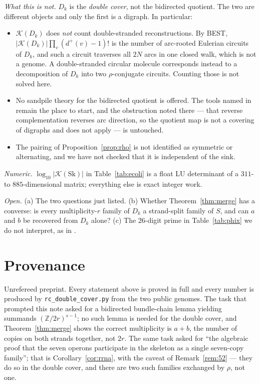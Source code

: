 \documentclass[11pt]{article}
\theoremstyle{plain}
\theoremstyle{definition}
\theoremstyle{remark}
\newcommand{\Z}{\mathbb{Z}}
\newcommand{\K}{\mathcal{K}}
\newcommand{\Sk}{\mathrm{Sk}}
\begin{document}
\emph{What this is not.} $D_k$ is the \emph{double cover}, not the bidirected quotient.
The two are different objects and only the first is a digraph. In particular:
\begin{itemize}
\item $\K(D_k)$ does \emph{not} count double-stranded reconstructions. By BEST,
$|\K(D_k)|\prod_v(d^{+}(v)-1)!$ is the number of arc-rooted Eulerian circuits of $D_k$,
and such a circuit traverses all $2N$ arcs in one closed walk, which is not a genome. A
double-stranded circular molecule corresponds instead to a decomposition of $D_k$ into two
$\rho$-conjugate circuits. Counting those is not solved here.
\item No sandpile theory for the bidirected quotient is offered. The tools
\cite{Zaslavsky} named in \cite{Bio1,Bio2} remain the place to start, and the obstruction
noted there --- that reverse complementation reverses arc direction, so the quotient map
is not a covering of digraphs and \cite{RT} does not apply --- is untouched.
\item The pairing of Proposition~\ref{prop:rho} is not identified as symmetric or
alternating, and we have not checked that it is independent of the sink.
\end{itemize}

\emph{Numeric.} $\log_{10}|\K(\Sk)|$ in Table~\ref{tab:ecoli} is a float LU determinant of
a $311$- to $885$-dimensional matrix; everything else is exact integer work.

\emph{Open.} (a) The two questions just listed. (b) Whether
Theorem~\ref{thm:merge} has a converse: is every multiplicity-$r$ family of $D_k$ a
strand-split family of $S$, and can $a$ and $b$ be recovered from $D_k$ alone?
(c) The $26$-digit prime in Table~\ref{tab:phix} we do not interpret, as in \cite{Bio3}.

\section*{Provenance}

Unrefereed preprint. Every statement above is proved in full and every number is produced
by \texttt{rc\_double\_cover.py} from the two public genomes. The task that prompted this
note asked for a bidirected bundle-chain lemma yielding summands
$(\Z/2r)^{s-1}$; no such lemma is needed for the double cover, and
Theorem~\ref{thm:merge} shows the correct multiplicity is $a+b$, the number of copies on
both strands together, not $2r$. The same task asked for ``the algebraic proof that the
seven operons participate in the skeleton as a single seven-copy family''; that is
Corollary~\ref{cor:rrna}, with the caveat of Remark~\ref{rem:52} --- they do so in the
double cover, and there are two such families exchanged by $\rho$, not one.
\end{document}
